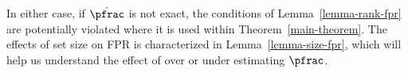 

In either case, if $\hat{\pfrac}$ is not exact, the conditions of Lemma~\ref*{lemma-rank-fpr} are potentially violated where it is used within Theorem~\ref{main-theorem}. The effects of set size on FPR is characterized in Lemma~\ref*{lemma-size-fpr}, which will help us understand the effect of over or under estimating $\pfrac$.


